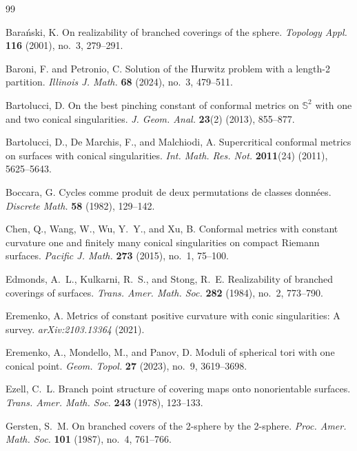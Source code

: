 \documentclass[microtype]{gtpart}     %
\theoremstyle{definition}
\begin{document}
\begin{thebibliography}{99}

Bara\'nski, K.
On realizability of branched coverings of the sphere.
\textit{Topology Appl.} \textbf{116} (2001), no.~3, 279--291.

Baroni, F. and Petronio, C.
Solution of the Hurwitz problem with a length-2 partition.
\textit{Illinois J. Math.} \textbf{68} (2024), no.~3, 479--511.

Bartolucci, D.
On the best pinching constant of conformal metrics on $\mathbb{S}^{2}$ with one and two conical singularities.
\textit{J. Geom. Anal.} \textbf{23}(2) (2013), 855--877.

Bartolucci, D., De Marchis, F., and Malchiodi, A.
Supercritical conformal metrics on surfaces with conical singularities.
\textit{Int. Math. Res. Not.} \textbf{2011}(24) (2011), 5625--5643.

Boccara, G.
Cycles comme produit de deux permutations de classes donn\'ees.
\textit{Discrete Math.} \textbf{58} (1982), 129--142.




Chen, Q., Wang, W., Wu, Y.~Y., and Xu, B.
Conformal metrics with constant curvature one and finitely many conical singularities on compact Riemann surfaces.
\textit{Pacific J. Math.} \textbf{273} (2015), no.~1, 75--100.




Edmonds, A.~L., Kulkarni, R.~S., and Stong, R.~E.
Realizability of branched coverings of surfaces.
\textit{Trans. Amer. Math. Soc.} \textbf{282} (1984), no.~2, 773--790.



Eremenko, A.
Metrics of constant positive curvature with conic singularities: A survey.
\textit{arXiv:2103.13364} (2021).

Eremenko, A., Mondello, M., and Panov, D.
Moduli of spherical tori with one conical point.
\textit{Geom. Topol.} \textbf{27} (2023), no.~9, 3619--3698.

Ezell, C.~L.
Branch point structure of covering maps onto nonorientable surfaces.
\textit{Trans. Amer. Math. Soc.} \textbf{243} (1978), 123--133.



Gersten, S.~M.
On branched covers of the 2-sphere by the 2-sphere.
\textit{Proc. Amer. Math. Soc.} \textbf{101} (1987), no.~4, 761--766.


\end{thebibliography}
\end{document}
